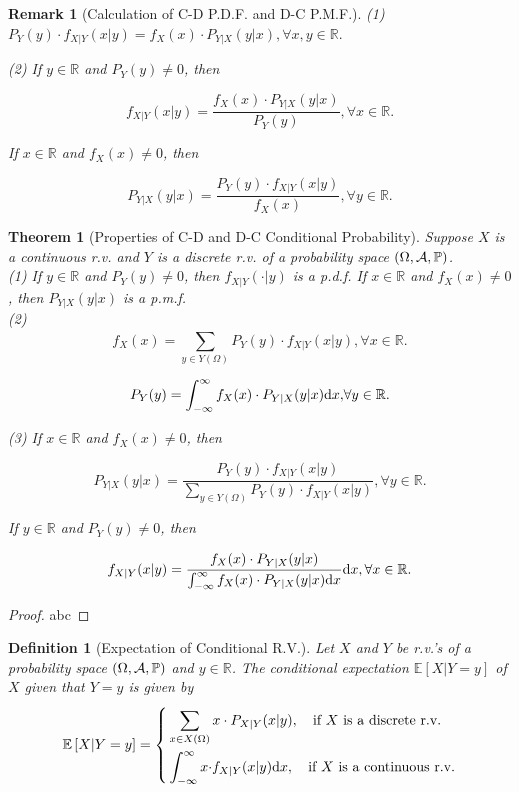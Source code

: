\documentclass[openany,12pt]{book}
\newtheorem{theorem}{Theorem}[chapter]
\newtheorem{remark}{Remark}[chapter]
\newtheorem{definition}{Definition}[chapter]
\begin{document}
\begin{remark}[Calculation of C-D P.D.F. and D-C P.M.F.]
  (1)
  $P_{Y}(y) \cdot f_{X|Y}(x|y)= f_{X}(x) \cdot P_{Y|X}(y|x), \forall x,y \in \mathbb{R}.$

  (2) If $y \in \mathbb{R}$ and $P_{Y}(y) \neq 0$, then

  \[f_{X|Y}(x|y)= \frac{f_{X}(x) \cdot P_{Y|X}(y|x)}{P_{Y}(y)},\forall x \in \mathbb{R}.\]

  If $x \in \mathbb{R}$ and $f_{X}(x) \neq 0$, then

  \[P_{Y|X}(y|x)= \frac{P_{Y}(y) \cdot f_{X|Y}(x|y)}{f_{X}(x)},\forall y \in \mathbb{R}.\]

\end{remark}

\begin{theorem}[Properties of C-D and D-C Conditional Probability]
  Suppose $X$ is a continuous r.v. and $Y$ is a discrete r.v. of a probability space $(\Omega,\mathcal{A},\mathbb{P})$.\\
  (1) If $y \in \mathbb{R}$ and $P_{Y}(y) \neq 0$, then
  $f_{X|Y}\left( \cdot | y \right)$ is a p.d.f. If $x \in \mathbb{R}$ and $f_{X}(x) \neq 0$, then $P_{Y|X}(y|x)$ is a p.m.f.\\
  (2)
  \[f_{X}(x)= \sum_{y \in Y(\Omega)}^{}{P_{Y}(y) \cdot f_{X|Y}(x|y)}, \forall x \in \mathbb{R}.\]

  \[P_{Y}(y)= \int_{- \infty}^{\infty}{f_{X}(x) \cdot P_{Y|X}(y|x)\mathrm{d} x,} \forall y \in \mathbb{R}.\]

  (3) If $x \in \mathbb{R}$ and $f_{X}(x) \neq 0$, then

  \[P_{Y|X}(y|x)= \frac{P_{Y}(y) \cdot f_{X|Y}(x|y)}{\sum_{y \in Y(\Omega)}^{}{P_{Y}(y) \cdot f_{X|Y}(x|y)}}, \forall y \in \mathbb{R}.\]

  If $y \in \mathbb{R}$ and $P_{Y}(y) \neq 0$, then

  \[f_{X|Y}(x|y)= \frac{f_{X}(x) \cdot P_{Y|X}(y|x)}{\int_{- \infty}^{\infty}{f_{X}(x) \cdot P_{Y|X}(y|x)\mathrm{d} x}}\mathrm{d} x, \forall x \in \mathbb{R}.\]
\end{theorem}

\begin{proof}
  abc
\end{proof}

\begin{definition}[Expectation of Conditional R.V.]
  Let $X$ and $Y$ be r.v.'s of a probability space $(\Omega,\mathcal{A},\mathbb{P})$ and
  $y \in \mathbb{R}$. The conditional expectation $\mathbb{E}[ X|Y = y]$ of $X$ given that $Y = y$ is given by
  \[\mathbb{E}\left[ X | Y = y \right] = \left\{ \begin{aligned}
       & \sum_{x \in X(\Omega)}^{}{x \cdot P_{X|Y}(x|y),\quad \text{if}~X~\text{is a discrete r.v.}}      \\
       & \int_{- \infty}^{\infty}{x \cdot}f_{X|Y}(x|y)\mathrm{d} x,\quad\text{if}~X~\text{is a continuous r.v.} \\
    \end{aligned} \right. \]
\end{definition}
\end{document}
